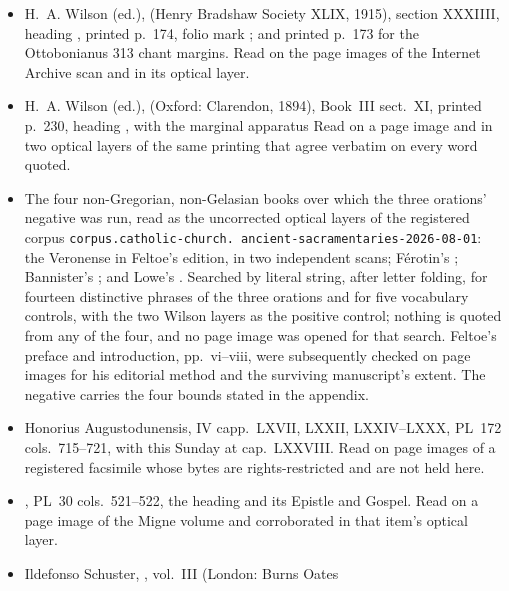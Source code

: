 \begin{itemize}
reported in this guide, what is reported is what that layer shows: the strings
behind those reports are the lightly normalised renderings of the layers
recorded in \texttt{propers/verified.md}, not quotations of the books. No
negative result here rests on any of the three.
\item H.~A. Wilson (ed.),  (Henry Bradshaw Society XLIX, 1915), section XXXIIII, heading
, printed p.~174, folio mark
\latin{[fo. 168v]}; and printed p.~173 for the Ottobonianus 313 chant margins.
Read on the page images of the Internet Archive scan and in its optical layer.
\item H.~A. Wilson (ed.),  (Oxford: Clarendon,
1894), Book~III sect.~XI, printed p.~230, heading , with
the marginal apparatus  Read on
a page image and in two optical layers of the same printing that agree verbatim
on every word quoted.
\item The four non-Gregorian, non-Gelasian books over which the three orations'
negative was run, read as the uncorrected optical layers of the registered
corpus \texttt{corpus.catholic-church.\allowbreak
ancient-sacramentaries-2026-08-01}: the Veronense in Feltoe's edition, in two
independent scans; Férotin's ;
Bannister's ; and Lowe's . Searched
by literal string, after letter folding, for fourteen distinctive phrases of
the three orations and for five vocabulary controls, with the two Wilson layers
as the positive control; nothing is quoted from any of the four, and no page
image was opened for that search. Feltoe's preface and introduction, pp.~vi--viii,
were subsequently checked on page images for his editorial method and the
surviving manuscript's extent. The negative carries the four bounds stated
in the appendix.
\item Honorius Augustodunensis,  IV capp.\ LXVII, LXXII,
LXXIV--LXXX, PL~172 cols.\ 715--721, with this Sunday at cap.~LXXVIII. Read on
page images of a registered facsimile whose bytes are rights-restricted and are
not held here.
\item {}, PL~30 cols.\ 521--522, the heading  and its Epistle and Gospel. Read on a page image of the Migne volume
and corroborated in that item's optical layer.
\item Ildefonso Schuster, , vol.~III (London: Burns Oates

\end{itemize}
